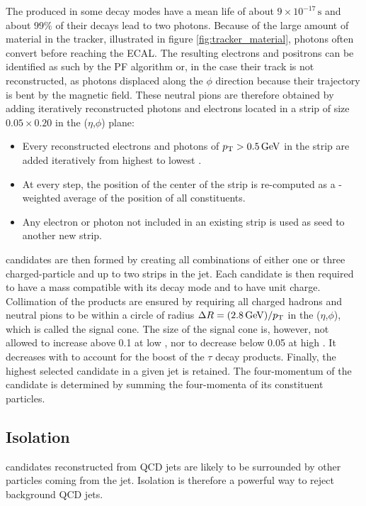 The \pizero produced in some decay modes have a mean life of about $9 \times 10^{-17}\,\mathrm{s}$ and about $99\%$ of their decays lead to two photons. Because of the large amount of material in the tracker, illustrated in figure \ref{fig:tracker_material}, photons often convert before reaching the ECAL. The resulting electrons and positrons can be identified as such by the PF algorithm or, in the case their track is not reconstructed, as photons displaced along the $\phi$ direction because their trajectory is bent by the magnetic field.
These neutral pions are therefore obtained by adding iteratively reconstructed photons and electrons located in a strip of size $0.05 \times 0.20$ in the ($\eta$,$\phi$) plane:
\begin{itemize}
    \item Every reconstructed electrons and photons of $p_{\mathrm{T}} > 0.5\,\mathrm{GeV}$ in the strip are added iteratively from highest to lowest \pt.
    \item At every step, the position of the center of the strip is re-computed as a \pt-weighted average of the position of all constituents.
    \item Any electron or photon not included in an existing strip is used as seed to another new strip.
\end{itemize}

\tauh candidates are then formed by creating all combinations of either one or three charged-particle and up to two strips in the jet.
Each \tauh candidate is then required to have a mass compatible with its decay mode and to have unit charge.
Collimation of the products are ensured by requiring all charged hadrons and neutral pions to be within a circle of radius $\Delta R = (2.8\,\mathrm{GeV})/p_{\mathrm{T}}$ in the ($\eta$,$\phi$), which is called the signal cone.
The size of the signal cone is, however, not allowed to increase above 0.1 at low \pt, nor to decrease below 0.05 at high \pt. It decreases with \pt to account for the boost of the $\tau$ decay products. Finally, the highest \pt selected \tauh candidate in a given jet is retained. The four-momentum of the \tauh candidate is determined by summing the four-momenta of its constituent particles.

\subsection{Isolation}


\tauh candidates reconstructed from QCD jets are likely to be surrounded by other particles coming from the jet.
Isolation is therefore a powerful way to reject background QCD jets.


